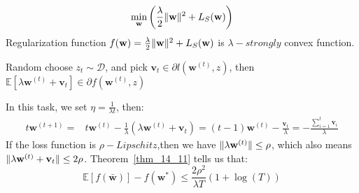\[ 
	\underset{\mathbf{w}}{\min} \left( 
		\frac{\lambda}{2} \Arrowvert \mathbf{w} \Arrowvert^2 + L_S(\mathbf{w})
	\right)
\]	
Regularization function $ f(\mathbf{w}) = \frac{\lambda}{2} \Arrowvert \mathbf{w} \Arrowvert^2 + L_S(\mathbf{w}) $ 
is $ \lambda-strongly $ convex function.
\begin{lem}
	Random choose $ z_t \sim \mathcal{D} $, and pick $ \mathbf{v}_t \in \partial l(\mathbf{w}^{(t)},z)$,
	then $ \mathbb{E} [\lambda \mathbf{w}^{(t)} + \mathbf{v}_t] \in \partial f(\mathbf{w}^{(t)}, z)$
\end{lem}
In this task, we set $ \eta = \frac{1}{\lambda t} $, then:
\begin{align*}
	t \mathbf{w}^{(t+1)} =& t \mathbf{w}^{(t)} - \frac{1}{\lambda}(\lambda \mathbf{w}^{(t)} + \mathbf{v}_t)
	= (t-1)\mathbf{w}^{(t)} - \frac{\mathbf{v}_t}{\lambda}
	= -\frac{\sum^t_{i=1}\mathbf{v}_i}{\lambda}
\end{align*}
If the loss function is $ \rho-Lipschitz $,then we have 
$ \Arrowvert \lambda \mathbf{w}^{(t)} \Arrowvert \le \rho $,
which also means $ \Arrowvert \lambda \mathbf{w}^{(t)} + \mathbf{v}_t \Arrowvert \le 2\rho $.
Theorem~\ref{thm_14_11} tells us that:
\begin{equation}
	\mathbb{E}[f(\bar{\mathbf{w}})] - f(\mathbf{w}^*) \le 
	\frac{2\rho^2}{\lambda T}(1+\log(T))
\end{equation}
